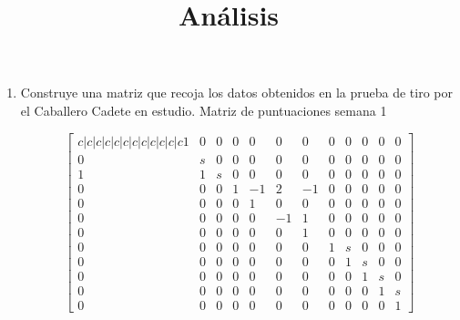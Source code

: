 \documentclass[10pt,a4paper]{article}
\title{Análisis}
\begin{document}
\maketitle


\begin{enumerate}
	\item \label{item1} Construye una matriz que recoja los datos obtenidos en la prueba de tiro por el Caballero Cadete en estudio.
		Matriz de puntuaciones semana 1
		
$$\begin{bmatrix}{c|c|c|c|c|c|c|c|c|c|c|c}
	1	&	0	&	0	&	0	&	0	&	0	&	0	&	0	&	0	&	0	&	0	&	0\\
	0	&	s	&	0	&	0	&	0	&	0	&	0	&	0	&	0	&	0	&	0	&	0\\
	1	&	1	&	s	&	0	&	0	&	0	&	0	&	0	&	0	&	0	&	0	&	0\\
	0	&	0	&	0	&	1	&	-1	&	2	&	-1	&	0	&	0	&	0	&	0	&	0\\
	0	&	0	&	0	&	0	&	1	&	0	&	0	&	0	&	0	&	0	&	0	&	0\\
	0	&	0	&	0	&	0	&	0	&	-1	&	1	&	0	&	0	&	0	&	0	&	0\\
	0	&	0	&	0	&	0	&	0	&	0	&	1	&	0	&	0	&	0	&	0	&	0\\
	0	&	0	&	0	&	0	&	0	&	0	&	0	&	1	&	s	&	0	&	0	&	0\\
	0	&	0	&	0	&	0	&	0	&	0	&	0	&	0	&	1	&	s	&	0	&	0\\
	0	&	0	&	0	&	0	&	0	&	0	&	0	&	0	&	0	&	1	&	s	&	0\\
	0	&	0	&	0	&	0	&	0	&	0	&	0	&	0	&	0	&	0	&	1	&	s\\
	0	&	0	&	0	&	0	&	0	&	0	&	0	&	0	&	0	&	0	&	0	&	1
\end{bmatrix}$$
	

\end{enumerate}
\end{document}
